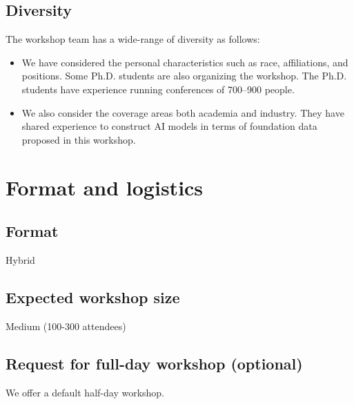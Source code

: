 \documentclass{article}
\begin{document}
\subsection{Diversity}
The workshop team has a wide-range of diversity as follows:
\begin{itemize}
    \item We have considered the personal characteristics such as race, affiliations, and positions. Some Ph.D. students are also organizing the workshop. The Ph.D. students have experience running conferences of 700–900 people.

    \item We also consider the coverage areas both academia and industry. They have shared experience to construct AI models in terms of foundation data proposed in this workshop.
\end{itemize}

\section{Format and logistics}
\subsection{Format}
Hybrid

\subsection{Expected workshop size}
Medium (100-300 attendees)

\subsection{Request for full-day workshop (optional)}
We offer a default half-day workshop.
\end{document}
